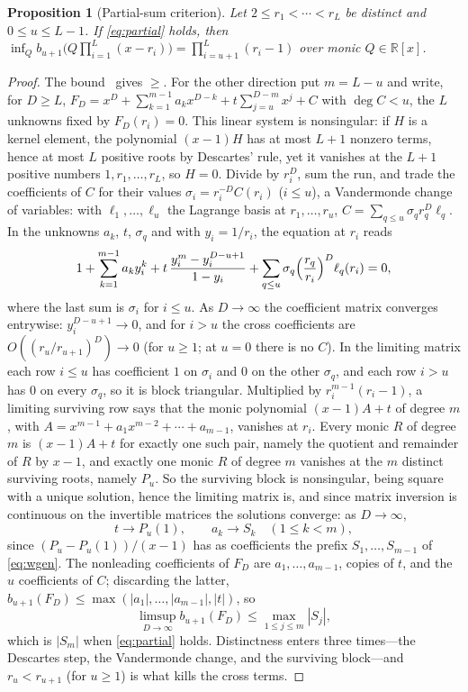 \documentclass[11pt]{article}
\newtheorem{proposition}[theorem]{Proposition}
\theoremstyle{definition}
\theoremstyle{plain}
\newcommand{\R}{\mathbb R}
\begin{document}
\begin{proposition}[Partial-sum criterion]\label{prop:partial}
Let $2\le r_1<\cdots<r_L$ be distinct and $0\le u\le L-1$.  If
\eqref{eq:partial} holds, then
$\inf_Qb_{u+1}\bigl(Q\prod_{i=1}^L(x-r_i)\bigr)=\prod_{i=u+1}^L(r_i-1)$ over
monic $Q\in\R[x]$.
\end{proposition}

\begin{proof}
The bound~\cite[Theorem~3.2]{coefficient-mass} gives $\ge$.  For the other direction put $m=L-u$ and write, for $D\ge L$,
$F_D=x^D+\sum_{k=1}^{m-1}a_kx^{D-k}+t\sum_{j=u}^{D-m}x^j+C$ with $\deg C<u$,
the $L$ unknowns fixed by $F_D(r_i)=0$.  This linear system is
nonsingular: if $H$ is a kernel element, the polynomial $(x-1)H$ has at most
$L+1$ nonzero terms, hence at most $L$ positive roots by Descartes' rule,
yet it vanishes at the $L+1$ positive numbers $1,r_1,\ldots,r_L$, so $H=0$.
Divide by $r_i^D$, sum the run, and trade the coefficients of $C$ for their
values $\sigma_i=r_i^{-D}C(r_i)$ ($i\le u$), a Vandermonde change of
variables: with $\ell_1,\ldots,\ell_u$ the Lagrange basis at $r_1,\ldots,r_u$,
$C=\sum_{q\le u}\sigma_qr_q^D\ell_q$.  In the unknowns $a_k$, $t$, $\sigma_q$
and with $y_i=1/r_i$, the equation at $r_i$ reads
\[
  1+\sum_{k=1}^{m-1}a_ky_i^k+t\,\frac{y_i^m-y_i^{D-u+1}}{1-y_i}
  +\sum_{q\le u}\sigma_q\Bigl(\frac{r_q}{r_i}\Bigr)^D\ell_q(r_i)=0 ,
\]
where the last sum is $\sigma_i$ for $i\le u$.  As $D\to\infty$ the
coefficient matrix converges entrywise: $y_i^{D-u+1}\to0$, and for $i>u$ the
cross coefficients are $O((r_u/r_{u+1})^D)\to0$ (for $u\ge1$; at $u=0$ there
is no $C$).  In the limiting matrix
each row $i\le u$ has coefficient $1$ on $\sigma_i$ and $0$ on the other
$\sigma_q$, and each row $i>u$ has $0$ on every $\sigma_q$, so it is block
triangular.  Multiplied by $r_i^{m-1}(r_i-1)$, a limiting surviving row says
that the monic polynomial $(x-1)A+t$ of degree $m$, with
$A=x^{m-1}+a_1x^{m-2}+\cdots+a_{m-1}$, vanishes at $r_i$.  Every monic $R$ of
degree $m$ is $(x-1)A+t$ for exactly one such pair, namely the quotient and
remainder of $R$ by $x-1$, and exactly one monic $R$ of degree $m$ vanishes
at the $m$ distinct surviving roots, namely $P_u$.  So the surviving block
is nonsingular, being square with a unique solution, hence the
limiting matrix is, and since matrix inversion is
continuous on the invertible matrices the solutions converge: as
$D\to\infty$,
\[
  t\to P_u(1),\qquad
  a_k\to S_k\quad(1\le k<m),
\]
since $(P_u-P_u(1))/(x-1)$ has as coefficients the prefix
$S_1,\ldots,S_{m-1}$ of \eqref{eq:wgen}.  The nonleading coefficients of
$F_D$ are $a_1,\ldots,a_{m-1}$, copies of $t$, and the $u$ coefficients of
$C$; discarding the latter, $b_{u+1}(F_D)\le\max(|a_1|,\ldots,|a_{m-1}|,|t|)$,
so
\[
  \limsup_{D\to\infty}b_{u+1}(F_D)\le\max_{1\le j\le m}|S_j|,
\]
which is $|S_m|$ when \eqref{eq:partial} holds.  Distinctness enters three
times---the Descartes step, the Vandermonde change, and the surviving
block---and $r_u<r_{u+1}$ (for $u\ge1$) is what kills the cross terms.
\end{proof}
\end{document}
